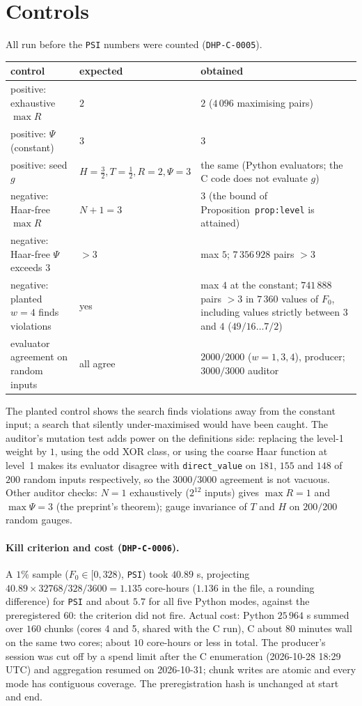 \documentclass[10pt]{article}
\begin{document}
\section{Controls}\label{sec:controls}
All run before the \texttt{PSI} numbers were counted (\texttt{DHP-C-0005}).
\begin{center}\small\begin{tabular}{p{4.4cm}p{3.2cm}p{6.0cm}}\toprule
control & expected & obtained\\\midrule
positive: exhaustive $\max R$ & $2$ & $2$ ($4\,096$ maximising pairs)\\
positive: $\Psi$(constant) & $3$ & $3$\\
positive: seed $g$ & $H=\tfrac32,T=\tfrac12,R=2,\Psi=3$ & the same (Python evaluators; the C code does not evaluate $g$)\\
negative: Haar-free $\max R$ & $N+1=3$ & $3$ (the bound of Proposition~\texttt{prop:level} is attained)\\
negative: Haar-free $\Psi$ exceeds $3$ & $>3$ & max $5$; $7\,356\,928$ pairs $>3$\\
negative: planted $w=4$ finds violations & yes & max $4$ at the constant; $741\,888$ pairs $>3$ in $7\,360$ values of $F_0$, including values strictly between $3$ and $4$ ($49/16\dots7/2$)\\
evaluator agreement on random inputs & all agree & $2000/2000$ ($w=1,3,4$), producer; $3000/3000$ auditor\\\bottomrule
\end{tabular}\end{center}
The planted control shows the search finds violations away from the constant input; a search that silently under-maximised would have been caught. The auditor's mutation test adds power on the definitions side: replacing the level-1 weight by $1$, using the odd XOR class, or using the coarse Haar function at level~1 makes its evaluator disagree with \texttt{direct\_value} on $181$, $155$ and $148$ of $200$ random inputs respectively, so the $3000/3000$ agreement is not vacuous. Other auditor checks: $N=1$ exhaustively ($2^{12}$ inputs) gives $\max R=1$ and $\max\Psi=3$ (the preprint's theorem); gauge invariance of $T$ and $H$ on $200/200$ random gauges.

\paragraph{Kill criterion and cost (\texttt{DHP-C-0006}).} A $1\%$ sample ($F_0\in[0,328)$, \texttt{PSI}) took $40.89$ s, projecting $40.89\times32768/328/3600=1.135$ core-hours ($1.136$ in the file, a rounding difference) for \texttt{PSI} and about $5.7$ for all five Python modes, against the preregistered $60$: the criterion did not fire. Actual cost: Python $25\,964$ s summed over $160$ chunks (cores 4 and 5, shared with the C run), C about $80$ minutes wall on the same two cores; about $10$ core-hours or less in total. The producer's session was cut off by a spend limit after the C enumeration (2026-10-28 18:29 UTC) and aggregation resumed on 2026-10-31; chunk writes are atomic and every mode has contiguous coverage. The preregistration hash is unchanged at start and end.
\end{document}
